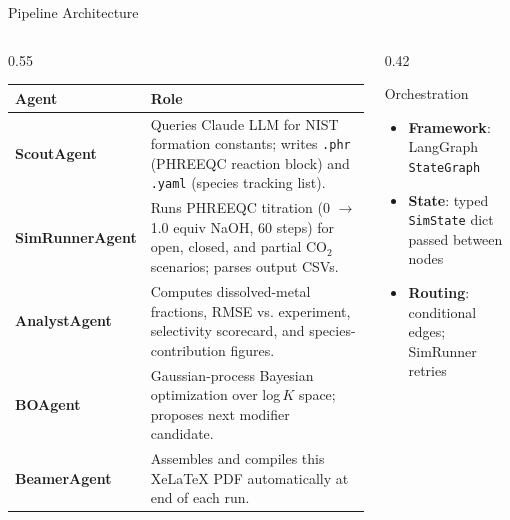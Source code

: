 \documentclass[8pt,aspectratio=169]{beamer}
\begin{document}
\begin{frame}{Pipeline Architecture}
  \begin{columns}[T]
    \begin{column}{0.55\textwidth}
      \small
      \renewcommand{\arraystretch}{1.35}
      \begin{tabular}{@{}lp{6.2cm}@{}}
        \toprule
        \textbf{Agent} & \textbf{Role} \\
        \midrule
        \textbf{ScoutAgent}     & Queries Claude LLM for NIST formation
                                  constants; writes \texttt{.phr} (PHREEQC
                                  reaction block) and \texttt{.yaml}
                                  (species tracking list). \\[4pt]
        \textbf{SimRunnerAgent} & Runs PHREEQC titration (0 $\to$ 1.0 equiv
                                  NaOH, 60 steps) for open, closed, and
                                  partial CO$_2$ scenarios; parses output
                                  CSVs. \\[4pt]
        \textbf{AnalystAgent}   & Computes dissolved-metal fractions, RMSE
                                  vs. experiment, selectivity scorecard, and
                                  species-contribution figures. \\[4pt]
        \textbf{BOAgent}        & Gaussian-process Bayesian optimization
                                  over log$\,K$ space; proposes next
                                  modifier candidate. \\[4pt]
        \textbf{BeamerAgent}    & Assembles and compiles this XeLaTeX PDF
                                  automatically at end of each run. \\
        \bottomrule
      \end{tabular}
    \end{column}
    \begin{column}{0.42\textwidth}
      \small
      \begin{block}{Orchestration}
        \begin{itemize}
          \setlength{\itemsep}{4pt}
          \item \textbf{Framework}: LangGraph \texttt{StateGraph}
          \item \textbf{State}: typed \texttt{SimState} dict passed
                between nodes
          \item \textbf{Routing}: conditional edges; SimRunner retries

\end{itemize}
\end{block}
\end{column}
\end{columns}
\end{frame}
\end{document}

